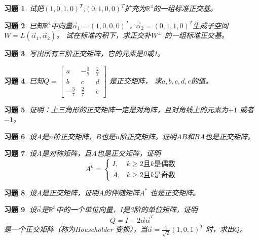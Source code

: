 \documentclass[a4paper]{book}
\newtheorem{ex}{习题}[chapter]
\begin{document}
\begin{ex}\label{6.18}
试把$(1,0,1,0)^T$,$(0,1,0,0)^T$扩充为$\mathbb{R}^4$的一组标准正交基。
\end{ex}

\begin{ex}\label{6.19}
已知$\mathbb{R}^4$中向量$\vec{\alpha}_1=(1,0,0,0)^T$，$\vec{\alpha}_2=(0,1,1,0)^T$生成子空间
$W=L(\vec{\alpha}_1,\vec{\alpha}_2)$。 试在标准内积下，求正交补$W^{\bot}$ 的一组标准正交基。
\end{ex}

\begin{ex}\label{6.20}
写出所有三阶正交矩阵，它的元素是0或1。
\end{ex}

\begin{ex}\label{6.21}
已知$Q=\begin{bmatrix}a&-\frac{3}{7}&\frac{2}{7}\\b&c&d\\-\frac{3}{7}&\frac{2}{7}&e\end{bmatrix}$ 是正交矩阵，
求$a,b,c,d,e$的值。
\end{ex}

\begin{ex}\label{6.22}
证明：上三角形的正交矩阵一定是对角阵，且对角线上的元素为$+1$ 或者$-1$。
\end{ex}

\begin{ex}\label{6.23}
设$A$是$n$阶正交矩阵，$B$也是$n$阶正交矩阵。证明$AB$和$BA$也是正交矩阵。
\end{ex}

\begin{ex}\label{6.24}
设$A$是对称矩阵，且$A$也是正交矩阵，证明
\begin{equation*}
 A^{k}=\begin{cases}
  I,& k\geq2\text{且}k\text{是偶数}\\
  A,& k\geq2\text{且}k\text{是奇数}
  \end{cases}
\end{equation*}
\end{ex}

\begin{ex}\label{6.25}
设$A$是正交矩阵，证明$A$的伴随矩阵$A^*$ 也是正交矩阵。
\end{ex}

\begin{ex}\label{6.26}
设$\vec{\alpha}$是$\mathbb{R}^3$中的一个单位向量，$I$是3阶的单位矩阵，证明
\begin{equation*}
Q=I-2\vec{\alpha}\vec{\alpha}^T
\end{equation*}
是一个正交矩阵（称为Householder 变换），当$\vec{\alpha}=\frac{1}{\sqrt{2}}(1,0,1)^T$ 时，求出$Q$。
\end{ex}
\end{document}
